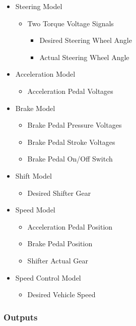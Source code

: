 \documentclass[12pt]{article} %
\begin{document}
\begin{figure}
\begin{itemize}
    \item Steering Model
    \begin{itemize}
    		\item Two Torque Voltage Signals
    		\begin{itemize}
    			\item Desired Steering Wheel Angle
    			\item Actual Steering Wheel Angle
    		\end{itemize}
    \end{itemize}
    \item Acceleration Model
    \begin{itemize}
    		\item Acceleration Pedal Voltages
    \end{itemize}
    \item Brake Model
    \begin{itemize}
    		\item Brake Pedal Pressure Voltages
    		\item Brake Pedal Stroke Voltages 
    		\item Brake Pedal On/Off Switch
    \end{itemize}
    \item Shift Model
    \begin{itemize}
    		\item Desired Shifter Gear
    \end{itemize}
    \item Speed Model
    \begin{itemize}
    		\item Acceleration Pedal Position
    		\item Brake Pedal Position
    		\item Shifter Actual Gear
    \end{itemize}
    \item Speed Control Model
    \begin{itemize}
    		\item Desired Vehicle Speed
    \end{itemize}
\end{itemize}

\subsubsection{Outputs}


\end{figure}
\end{document}
